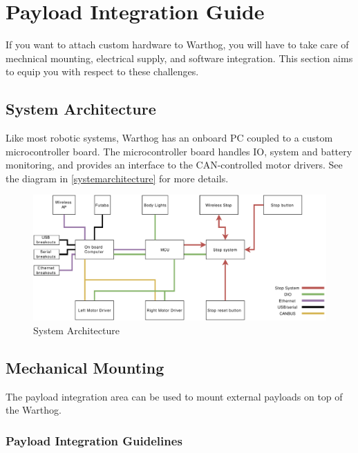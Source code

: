 \documentclass[]{clearpath-latex/clearpath-manual}
\begin{document}
\section{Payload Integration Guide}

If you want to attach custom hardware to Warthog, you will have to take care of mechnical mounting, electrical supply, and software integration.  This section aims to equip you with respect to these challenges.

\subsection{System Architecture}

Like most robotic systems, Warthog has an onboard PC coupled to a custom microcontroller board. The microcontroller board handles IO, system and battery monitoring, and provides an interface to the CAN-controlled motor drivers. See the diagram in \autoref{systemarchitecture} for more details.

\begin{figure}[!htb]
  \centering
  \includegraphics[width=1.0\linewidth]{warthog-logic-conn.pdf}
  \caption{System Architecture}
  \label{systemarchitecture}
\end{figure}

\pagebreak[4]
\subsection{Mechanical Mounting}
\label{mechanical}

The payload integration area can be used to mount external payloads on top of the Warthog.


\subsubsection{Payload Integration Guidelines}
\end{document}
